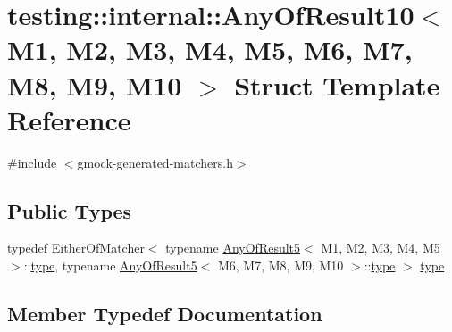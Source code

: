 \hypertarget{structtesting_1_1internal_1_1AnyOfResult10}{}\section{testing\+::internal\+::Any\+Of\+Result10$<$ M1, M2, M3, M4, M5, M6, M7, M8, M9, M10 $>$ Struct Template Reference}
\label{structtesting_1_1internal_1_1AnyOfResult10}


{\ttfamily \#include $<$gmock-\/generated-\/matchers.\+h$>$}

\subsection*{Public Types}
\begin{DoxyCompactItemize}
\item 
typedef Either\+Of\+Matcher$<$ typename \mbox{\hyperlink{structtesting_1_1internal_1_1AnyOfResult5}{Any\+Of\+Result5}}$<$ M1, M2, M3, M4, M5 $>$\+::\mbox{\hyperlink{structtesting_1_1internal_1_1AnyOfResult10_aa1cb3d733f29716f2015db8a2b6c1c94}{type}}, typename \mbox{\hyperlink{structtesting_1_1internal_1_1AnyOfResult5}{Any\+Of\+Result5}}$<$ M6, M7, M8, M9, M10 $>$\+::\mbox{\hyperlink{structtesting_1_1internal_1_1AnyOfResult10_aa1cb3d733f29716f2015db8a2b6c1c94}{type}} $>$ \mbox{\hyperlink{structtesting_1_1internal_1_1AnyOfResult10_aa1cb3d733f29716f2015db8a2b6c1c94}{type}}
\end{DoxyCompactItemize}


\subsection{Member Typedef Documentation}
\mbox{\label{structtesting_1_1internal_1_1AnyOfResult10_aa1cb3d733f29716f2015db8a2b6c1c94}} 
